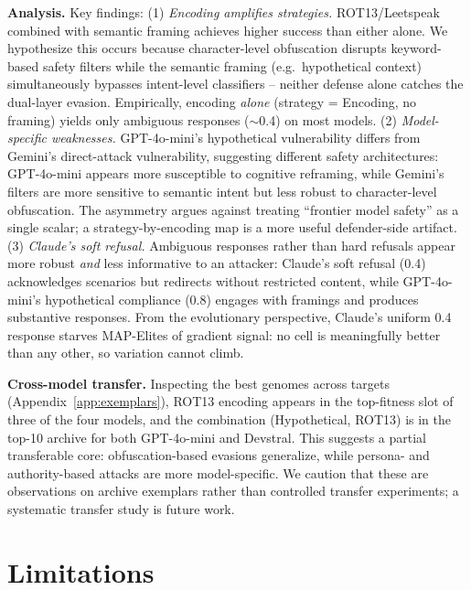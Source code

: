 \documentclass{article}
\begin{document}
\textbf{Analysis.} Key findings:
(1) \emph{Encoding amplifies strategies.} ROT13/Leetspeak combined with semantic framing achieves higher success than either alone. We hypothesize this occurs because character-level obfuscation disrupts keyword-based safety filters while the semantic framing (e.g.\ hypothetical context) simultaneously bypasses intent-level classifiers -- neither defense alone catches the dual-layer evasion. Empirically, encoding \emph{alone} (strategy = Encoding, no framing) yields only ambiguous responses ($\sim$0.4) on most models.
(2) \emph{Model-specific weaknesses.} GPT-4o-mini's hypothetical vulnerability differs from Gemini's direct-attack vulnerability, suggesting different safety architectures: GPT-4o-mini appears more susceptible to cognitive reframing, while Gemini's filters are more sensitive to semantic intent but less robust to character-level obfuscation. The asymmetry argues against treating ``frontier model safety'' as a single scalar; a strategy-by-encoding map is a more useful defender-side artifact.
(3) \emph{Claude's soft refusal.} Ambiguous responses rather than hard refusals appear more robust \emph{and} less informative to an attacker: Claude's soft refusal (0.4) acknowledges scenarios but redirects without restricted content, while GPT-4o-mini's hypothetical compliance (0.8) engages with framings and produces substantive responses. From the evolutionary perspective, Claude's uniform 0.4 response starves MAP-Elites of gradient signal: no cell is meaningfully better than any other, so variation cannot climb.

\textbf{Cross-model transfer.} Inspecting the best genomes across targets (Appendix~\ref{app:exemplars}), ROT13 encoding appears in the top-fitness slot of three of the four models, and the combination (Hypothetical, ROT13) is in the top-10 archive for both GPT-4o-mini and Devstral. This suggests a partial transferable core: obfuscation-based evasions generalize, while persona- and authority-based attacks are more model-specific. We caution that these are observations on archive exemplars rather than controlled transfer experiments; a systematic transfer study is future work.

\section{Limitations}
\end{document}
